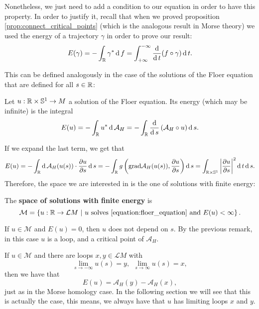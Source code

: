 Nonetheless, we just need to add a condition to our equation in order to have this property. In order to justify it, recall that when we proved proposition \ref{prop:connect_critical_points} (which is the analogous result in Morse theory) we used the energy of a trajectory $\gamma$ in order to prove our result:
$$E(\gamma) = - \int_{\mathbb{R}} \gamma^{\ast} \operatorname d f = \int_{+\infty}^{-\infty} \frac{\operatorname d}{\operatorname d t} (f \circ \gamma) \operatorname d t .$$

This can be defined analogously in the case of the solutions of the Floer equation that are defined for all $s \in \mathbb{R}$:

\begin{deff} \label{definition:floer_energy}
Let $u : \mathbb{R} \times \mathbb{S}^1 \rightarrow M$ a solution of the Floer equation. Its energy (which may be infinite) is the integral
$$E(u) = - \int_{\mathbb{R}} u^{\ast} \operatorname d \mathcal{A}_H = - \int_{\mathbb{R}} \frac{\operatorname d}{\operatorname d s} \left( \mathcal{A}_H \circ u \right) \operatorname d s .$$
\end{deff}

If we expand the last term, we get that
$$E(u) = - \int_{\mathbb{R}} \operatorname d \mathcal{A}_H(u(s)) \cdot \frac{\partial u}{\partial s} \operatorname d s = - \int_{\mathbb{R}} g \left(\text{grad}\mathcal{A}_H(u(s)),\frac{\partial u}{\partial s} \right) \operatorname d s = \int_{\mathbb{R} \times \mathbb{S}^1} \left| \frac{\partial u}{\partial s} \right|^2 \operatorname d t \operatorname d s .$$
Therefore, the space we are interested in is the one of solutions with finite energy:

\begin{deff} \label{definition:finite_energy_space}
The {\bf space of solutions with finite energy} is
$$\mathcal{M} = \left\{ u : \mathbb{R} \rightarrow \mathcal{L}M \ | \ u \text{ solves \ref{equation:floer_equation} and } E(u) < \infty \right\} .$$
\end{deff}

\begin{rmrk}
If $u \in \mathcal{M}$ and $E(u) = 0$, then $u$ does not depend on $s$. By the previous remark, in this case $u$ is a loop, and a critical point of $\mathcal{A}_H$.
\end{rmrk}

\begin{rmrk}
If $u \in \mathcal{M}$ and there are loops $x,y \in \mathcal{L}M$ with
$$\lim_{s \rightarrow -\infty} u(s) = y, \ \ \lim_{s \rightarrow \infty} u(s) = x ,$$
then we have that
$$E(u) = \mathcal{A}_H(y) - \mathcal{A}_H(x) ,$$
just as in the Morse homology case.
In the following section we will see that this is actually the case, this means, we always have that $u$ has limiting loops $x$ and $y$.
\end{rmrk}

